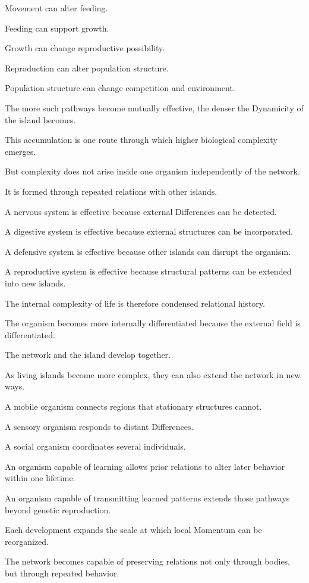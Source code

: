 Movement can alter feeding.

Feeding can support growth.

Growth can change reproductive possibility.

Reproduction can alter population structure.

Population structure can change competition and environment.

The more such pathways become mutually effective, the denser the Dynamicity of the island becomes.

This accumulation is one route through which higher biological complexity emerges.

But complexity does not arise inside one organism independently of the network.

It is formed through repeated relations with other islands.

A nervous system is effective because external Differences can be detected.

A digestive system is effective because external structures can be incorporated.

A defensive system is effective because other islands can disrupt the organism.

A reproductive system is effective because structural patterns can be extended into new islands.

The internal complexity of life is therefore condensed relational history.

The organism becomes more internally differentiated because the external field is differentiated.

The network and the island develop together.

As living islands become more complex, they can also extend the network in new ways.

A mobile organism connects regions that stationary structures cannot.

A sensory organism responds to distant Differences.

A social organism coordinates several individuals.

An organism capable of learning allows prior relations to alter later behavior within one lifetime.

An organism capable of transmitting learned patterns extends those pathways beyond genetic reproduction.

Each development expands the scale at which local Momentum can be reorganized.

The network becomes capable of preserving relations not only through bodies, but through repeated behavior.

